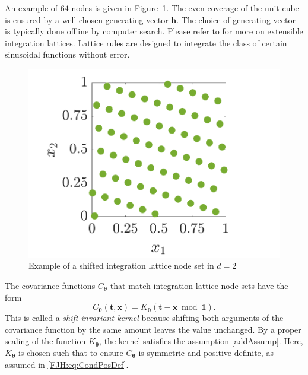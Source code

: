 \documentclass{iitthesis}          %
\newcommand{\bm}[1]{\boldsymbol{#1}}
\newcommand{\vtheta}{{\bm{\theta}}}
\newcommand{\vh}{\bm{h}}
\newcommand{\vt}{\bm{t}}
\newcommand{\vx}{\bm{x}}
\newcommand{\vone}{\bm{1}}
\begin{document}
An example of $64$ nodes is given in Figure~\ref{latticefig}.  The even coverage of the unit cube is ensured by a well chosen generating vector $\vh$.  The choice of generating vector is typically done offline by computer search.  Please refer to \cite{DicEtal14a, HicNie03a} for more on extensible integration lattices. Lattice rules are designed to integrate the class of certain sinusoidal functions without error.
\begin{figure}[htp]
	\centering
	\includegraphics[width=0.8\linewidth]{ShiftedLatticePoints}
	\caption{Example of a shifted integration lattice node set  in $d=2$ \label{latticefig} }
\end{figure}

\label{sec:shift_invar_kern}

The covariance functions $C_{\vtheta}$ that match integration lattice node sets have the form
\begin{equation} \label{eq:shInv}
C_{\vtheta}(\vt,\vx) = K_{\vtheta}(\vt - \vx \bmod \vone).
\end{equation}
This is called a \emph{shift invariant kernel} because shifting both arguments of the covariance function by the same amount leaves the value unchanged.   By a proper scaling of the function $K_{\vtheta}$, the kernel satisfies the assumption \eqref{addAssump}. 
Here, $K_{\vtheta}$ is chosen such that to ensure
$C_{\vtheta}$ is symmetric and positive definite, as assumed in \eqref{FJH:eq:CondPosDef}. 
\end{document}
